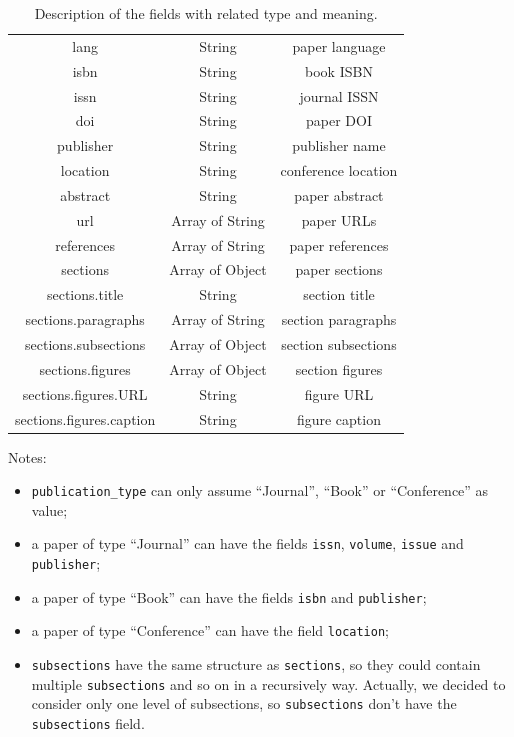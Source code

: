 \begin{table}[H]
\begin{center}
\begin{tabular}{|c|c|c|}
            lang                     & String          & paper language\T\B        \\
            isbn                     & String          & book ISBN\T\B             \\
            issn                     & String          & journal ISSN\T\B          \\
            doi                      & String          & paper DOI\T\B             \\
            publisher                & String          & publisher name\T\B        \\
            location                 & String          & conference location\T\B   \\
            abstract                 & String          & paper abstract\T\B        \\
            url                      & Array of String & paper URLs\T\B            \\
            references               & Array of String & paper references\T\B      \\
            sections                 & Array of Object & paper sections\T\B        \\
            sections.title           & String          & section title\T\B         \\
            sections.paragraphs      & Array of String & section paragraphs\T\B    \\
            sections.subsections     & Array of Object & section subsections\T\B   \\
            sections.figures         & Array of Object & section figures\T\B       \\
            sections.figures.URL     & String          & figure URL\T\B            \\
            sections.figures.caption & String          & figure caption\T\B        \\
            \hline
        \end{tabular}
        \caption{Description of the fields with related type and meaning.}
        \label{tab:table3}%
    \end{center}
\end{table}
Notes:
\begin{itemize}
    \item \verb|publication_type| can only assume ``Journal'', ``Book'' or ``Conference'' as value;
    \item a paper of type ``Journal'' can have the fields \verb|issn|, \verb|volume|, \verb|issue| and \verb|publisher|;
    \item a paper of type ``Book'' can have the fields \verb|isbn| and \verb|publisher|;
    \item a paper of type ``Conference'' can have the field \verb|location|;
    \item \verb|subsections| have the same structure as \verb|sections|, so they could contain multiple \verb|subsections| and so on in a recursively way.
    Actually, we decided to consider only one level of subsections, so \verb|subsections| don't have the \verb|subsections| field.
\end{itemize}
